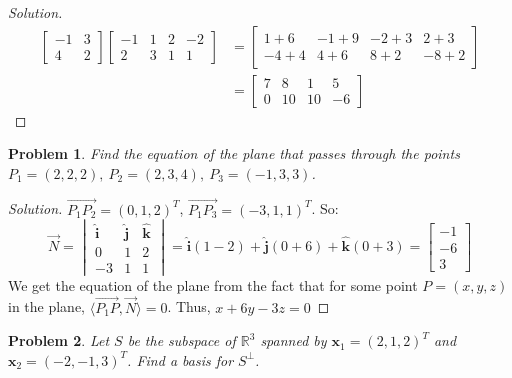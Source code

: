 \documentclass{article}
\theoremstyle{mystyle}
\newtheorem{problem}{Problem}[section]
\begin{document}
\begin{proof}[Solution]
\begin{align*}
    \begin{bmatrix} -1 & 3 \\ 4 & 2 \end{bmatrix} \begin{bmatrix} -1 & 1 & 2 & -2 \\ 2 & 3 & 1 & 1 \end{bmatrix} &= \begin{bmatrix} 1+6 & -1 + 9 & -2 +3 & 2 + 3 \\ -4 + 4 & 4+6 & 8 + 2 & -8 + 2 \end{bmatrix}\\
    &= \begin{bmatrix} 7 & 8 & 1 & 5 \\ 0 & 10 & 10 & -6 \end{bmatrix}
\end{align*}
\end{proof}
\begin{problem}
Find the equation of the plane that passes through the points $P_1 = (2,2,2),\ P_2 = (2,3,4),\ P_3 = (-1,3,3)$.
\end{problem}
\begin{proof}[Solution]
$\overrightarrow{P_1P_2} = (0,1,2)^{T}$, $\overrightarrow{P_1 P_3} = (-3,1,1)^{T}$. So:
\begin{equation*}
    \overrightarrow{N} = \begin{vmatrix} \hat{\mathbf{i}} & \hat{\mathbf{j}} & \hat{\mathbf{k}} \\ 0 & 1 & 2 \\ -3 & 1 & 1 \end{vmatrix} = \hat{\mathbf{i}}(1-2) + \hat{\mathbf{j}}(0+6) + \hat{\mathbf{k}}(0+3)=\begin{bmatrix}-1 \\ -6 \\ 3\end{bmatrix}   
\end{equation*}
We get the equation of the plane from the fact that for some point $P=(x,y,z)$ in the plane, $\langle \overrightarrow{P_1P}, \overrightarrow{N}\rangle = 0$. Thus, $x + 6y - 3z =0$
\end{proof}
\begin{problem}
Let $S$ be the subspace of $\mathbb{R}^3$ spanned by $\mathbf{x}_1 = (2,1,2)^T$ and $\mathbf{x}_2 = (-2,-1,3)^T$. Find a basis for $S^{\perp}$.
\end{problem}
\end{document}
